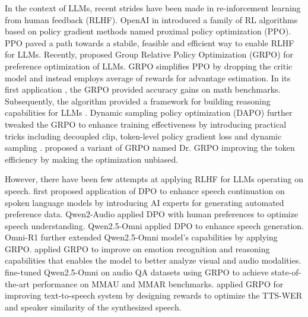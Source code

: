 \documentclass[conference]{IEEEtran}
\begin{document}
In the context of LLMs, recent strides have been made in re-inforcement learning from human feedback (RLHF).
OpenAI in \cite{schulman2017proximal} introduced a family of RL algorithms based on policy gradient methods named proximal policy optimization (PPO).
PPO paved a path towards a stabile, feasible and efficient way to enable RLHF for LLMs.
Recently, \cite{shao2024deepseekmath} proposed Group Relative Policy Optimization (GRPO) for preference optimization of LLMs.
GRPO simplifies PPO by dropping the critic model and instead employs average of rewards for advantage estimation.
In its first application \cite{shao2024deepseekmath}, the GRPO provided accuracy gains on math benchmarks.
Subsequently, the algorithm provided a framework for building reasoning capabilities for LLMs \cite{guo2025deepseek}.
Dynamic sampling policy optimization (DAPO) further tweaked the GRPO to enhance training effectiveness by introducing practical tricks including decoupled clip, token-level policy gradient loss and dynamic sampling \cite{yu2025dapo}.
\cite{liu2025understanding} proposed a variant of GRPO named Dr. GRPO improving the token efficiency by making the optimization unbiased.


However, there have been few attempts at applying RLHF for LLMs operating on speech.
\cite{lin2024align} first proposed application of DPO to enhance speech continuation on spoken language models by introducing AI experts for generating automated preference data.
Qwen2-Audio \cite{chu2024qwen2} applied DPO with human preferences to optimize speech understanding.
Qwen2.5-Omni \cite{xu2025qwen2} applied DPO to enhance speech generation.
Omni-R1 \cite{zhong2025omni} further extended Qwen2.5-Omni model's capabilities by applying GRPO.
\cite{zhao2025r1} applied GRPO to improve on emotion recognition and reasoning capabilities that enables the model to better analyze visual and audio modalities.
\cite{rouditchenko2025omni, wen2025sari, li2025reinforcement} fine-tuned Qwen2.5-Omni on audio QA datasets using GRPO to achieve state-of-the-art performance on MMAU and MMAR benchmarks.
\cite{sun2025f5r} applied GRPO for improving text-to-speech system by designing rewards to optimize the TTS-WER and speaker similarity of the synthesized speech.
\end{document}
